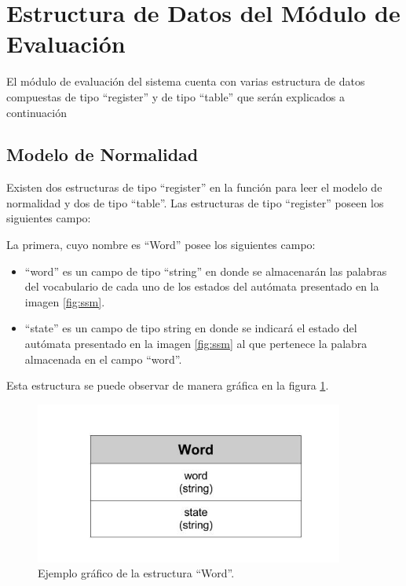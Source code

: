 \section*{Estructura de Datos del Módulo de Evaluación}

El módulo de evaluación del sistema cuenta con varias estructura de datos compuestas de tipo ``register'' y de tipo ``table'' que serán explicados a continuación 

\subsection*{Modelo de Normalidad}
\label{sssec:estructuraModelo}

Existen dos estructuras de tipo ``register'' en la función para leer el modelo de normalidad y dos de tipo ``table''.
Las estructuras de tipo ``register'' poseen los siguientes campo:

La primera, cuyo nombre es ``Word'' posee los siguientes campo:
\begin{itemize}
\item ``word'' es un campo de tipo ``string'' en donde se almacenarán las palabras del vocabulario de cada uno de los estados del autómata presentado en la imagen \ref{fig:ssm}.
\item ``state'' es un campo de tipo string en donde se indicará el estado del autómata presentado en la imagen \ref{fig:ssm} al que pertenece la palabra almacenada en el campo ``word''.
\end{itemize}

Esta estructura se puede observar de manera gráfica en la figura \ref{fig:WORD}.

\begin{figure}[!htb]
\begin{center}
\includegraphics[width=4in]{./img/Word.jpg}
\caption{Ejemplo gráfico de la estructura ``Word''.}
\label{fig:WORD}
\end{center}
\end{figure}	

